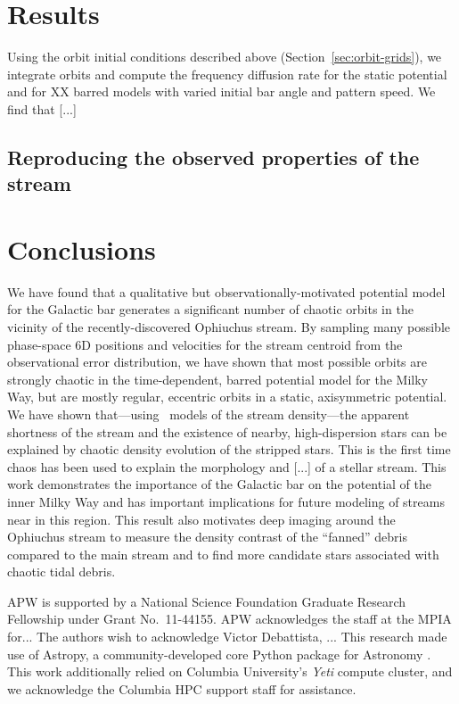 \documentclass[letterpaper,12pt,preprint]{aastex}
\begin{document}
\section{Results}

Using the orbit initial conditions described above (Section~\ref{sec:orbit-grids}), we integrate orbits and compute the frequency diffusion rate for the static potential and for XX barred models with varied initial bar angle and pattern speed. We find that [...] 

\subsection{Reproducing the observed properties of the stream}\label{sec:results2}

\section{Conclusions}\label{sec:conclusions}

We have found that a qualitative but observationally-motivated potential model for the Galactic bar generates a significant number of chaotic orbits in the vicinity of the recently-discovered Ophiuchus stream. By sampling many possible phase-space 6D positions and velocities for the stream centroid from the observational error distribution, we have shown that most possible orbits are strongly chaotic in the time-dependent, barred potential model for the Milky Way, but are mostly regular, eccentric orbits in a static, axisymmetric potential. We have shown that---using \streakline\ models of the stream density---the apparent shortness of the stream and the existence of nearby, high-dispersion stars can be explained by chaotic density evolution of the stripped stars. This is the first time chaos has been used to explain the morphology and [...] of a stellar stream. This work demonstrates the importance of the Galactic bar on the potential of the inner Milky Way and has important implications for future modeling of streams near in this region. This result also motivates deep imaging around the Ophiuchus stream to measure the density contrast of the ``fanned'' debris compared to the main stream and to find more candidate stars associated with chaotic tidal debris.

\acknowledgements
APW is supported by a National Science Foundation Graduate Research Fellowship under Grant No.\ 11-44155.
APW acknowledges the staff at the MPIA for...
The authors wish to acknowledge Victor Debattista, ...
This research made use of Astropy, a community-developed core Python package for Astronomy \citep{astropy13}.
This work additionally relied on Columbia University's \emph{Yeti} compute cluster, and we acknowledge the Columbia HPC support staff for assistance. \\
\end{document}
